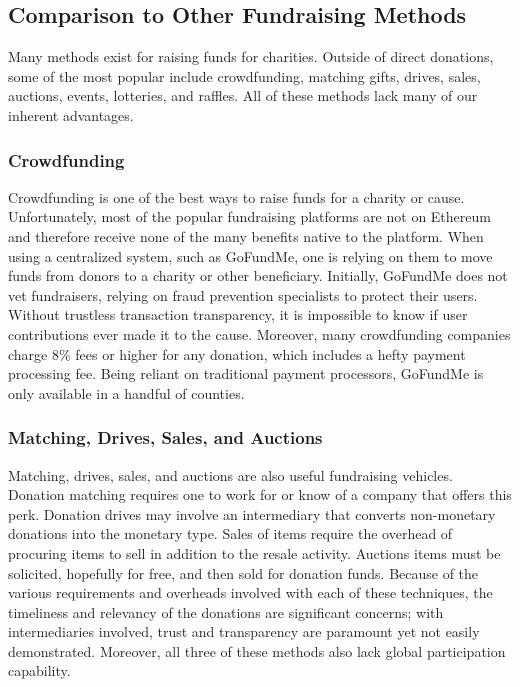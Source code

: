 \documentclass[11pt]{article}
\begin{document}
\subsection{Comparison to Other Fundraising Methods}

Many methods exist for raising funds for charities. Outside of direct donations, some of the most popular include crowdfunding, matching gifts, drives, sales, auctions, events, lotteries, and raffles. All of these methods lack many of our inherent advantages.

\subsubsection{Crowdfunding}

Crowdfunding is one of the best ways to raise funds for a charity or cause. Unfortunately, most of the popular fundraising platforms are not on Ethereum and therefore receive none of the many benefits native to the platform. When using a centralized system, such as GoFundMe, one is relying on them to move funds from donors to a charity or other beneficiary. Initially, GoFundMe does not vet fundraisers, relying on fraud prevention specialists to protect their users. Without trustless transaction transparency, it is impossible to know if user contributions ever made it to the cause. Moreover, many crowdfunding companies charge 8\% fees or higher for any donation, which includes a hefty payment processing fee. Being reliant on traditional payment processors, GoFundMe is only available in a handful of counties.

\subsubsection{Matching, Drives, Sales, and Auctions}

Matching, drives, sales, and auctions are also useful fundraising vehicles. Donation matching requires one to work for or know of a company that offers this perk. Donation drives may involve an intermediary that converts non-monetary donations into the monetary type. Sales of items require the overhead of procuring items to sell in addition to the resale activity. Auctions items must be solicited, hopefully for free, and then sold for donation funds. Because of the various requirements and overheads involved with each of these techniques, the timeliness and relevancy of the donations are significant concerns; with intermediaries involved, trust and transparency are paramount yet not easily demonstrated. Moreover, all three of these methods also lack global participation capability.
\end{document}
